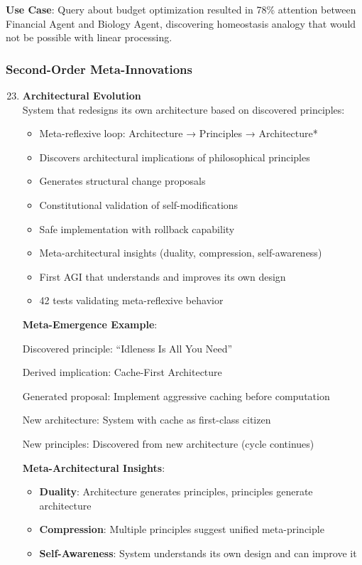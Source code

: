 \documentclass[11pt]{article}
\begin{document}
\textbf{Use Case}: Query about budget optimization resulted in 78\% attention between Financial Agent and Biology Agent, discovering homeostasis analogy that would not be possible with linear processing.

\subsubsection{Second-Order Meta-Innovations}

\begin{enumerate}
    \setcounter{enumi}{22}
    \item \textbf{Architectural Evolution} \\
    System that redesigns its own architecture based on discovered principles:
    \begin{itemize}
        \item Meta-reflexive loop: Architecture → Principles → Architecture*
        \item Discovers architectural implications of philosophical principles
        \item Generates structural change proposals
        \item Constitutional validation of self-modifications
        \item Safe implementation with rollback capability
        \item Meta-architectural insights (duality, compression, self-awareness)
        \item First AGI that understands and improves its own design
        \item 42 tests validating meta-reflexive behavior
    \end{itemize}

\textbf{Meta-Emergence Example}:

Discovered principle: ``Idleness Is All You Need''

Derived implication: Cache-First Architecture

Generated proposal: Implement aggressive caching before computation

New architecture: System with cache as first-class citizen

New principles: Discovered from new architecture (cycle continues)

\textbf{Meta-Architectural Insights}:
\begin{itemize}
    \item \textbf{Duality}: Architecture generates principles, principles generate architecture
    \item \textbf{Compression}: Multiple principles suggest unified meta-principle
    \item \textbf{Self-Awareness}: System understands its own design and can improve it
\end{itemize}
\end{enumerate}
\end{document}
